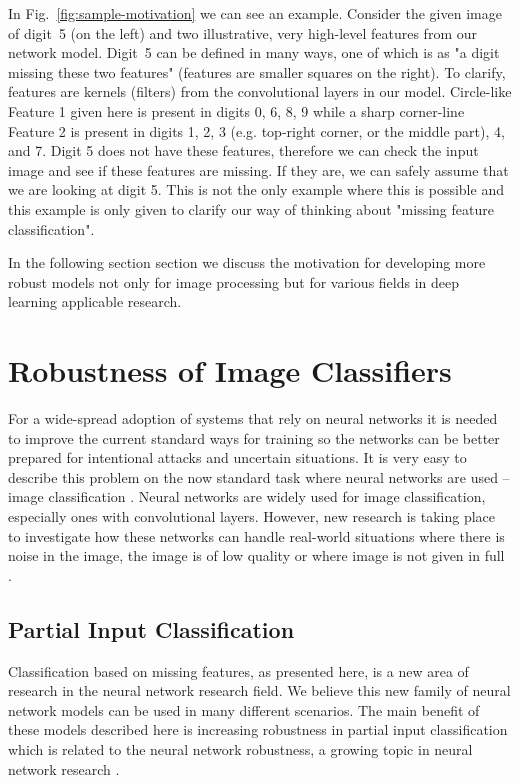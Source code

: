 \documentclass[b5paper]{book}
\let\cite\parencite
\begin{document}
In Fig.~\ref{fig:sample-motivation} we can see an example. Consider the given image of digit~5 (on the left) and two illustrative, very high-level features from our network model. Digit~5 can be defined in many ways, one of which is as "a digit missing these two features" (features are smaller squares on the right). To clarify, features are kernels (filters) from the convolutional layers in our model. Circle-like Feature 1 given here is present in digits 0, 6, 8, 9 while a sharp corner-line Feature 2 is present in digits 1, 2, 3 (e.g. top-right corner, or the middle part), 4, and 7. Digit 5 does not have these features, therefore we can check the input image and see if these features are missing. If they are, we can safely assume that we are looking at digit 5. This is not the only example where this is possible and this example is only given to clarify our way of thinking about "missing feature classification". 

In the following section section we discuss the motivation for developing more robust models not only for image processing but for various fields in deep learning applicable research.

\section{Robustness of Image Classifiers}

For a wide-spread adoption of systems that rely on neural networks it is needed to improve the current standard ways for training so the networks can be better prepared for intentional attacks and uncertain situations. It is very easy to describe this problem on the now standard task where neural networks are used -- image classification \cite{krizhevsky2012imagenet}. Neural networks are widely used for image classification, especially ones with convolutional layers. However, new research is taking place to investigate how these networks can handle real-world situations where there is noise in the image, the image is of low quality or where image is not given in full \cite{carlini2017towards, bastani2016measuring}. 

\subsection{Partial Input Classification}

Classification based on missing features, as presented here, is a new area of research in the neural network research field. We believe this new family of neural network models can be used in many different scenarios. The main benefit of these models described here is increasing robustness in partial input classification which is related to the neural network robustness, a growing topic in neural network research \cite{carlini2017towards}.
\end{document}
